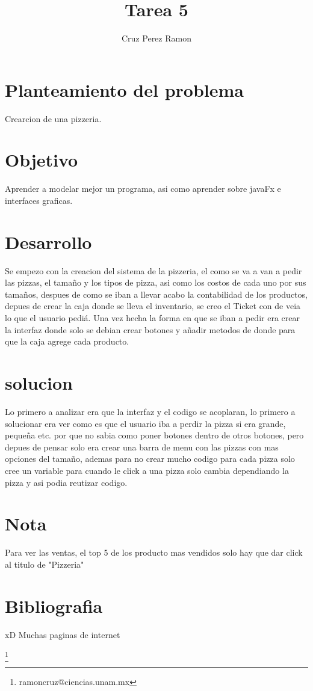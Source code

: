 \documentclass[12pt]{article}
\title{Tarea 5}
\author{Cruz Perez Ramon}
\begin{document}
\maketitle

\section{Planteamiento del problema}
Crearcion de una pizzeria.

\section{Objetivo}
Aprender a modelar mejor un programa, asi como aprender sobre javaFx e interfaces graficas.

\section{Desarrollo}
Se empezo con la creacion del sistema de la pizzeria, el como se va a van a pedir las pizzas, el tamaño y los tipos de pizza, asi como los costos de cada uno por sus tamaños, despues de como se iban a llevar acabo la contabilidad de los productos, depues de crear la caja donde se lleva el inventario, se creo el Ticket con de veia lo que el usuario pediá. Una vez hecha la forma en que se iban a pedir era crear la interfaz donde solo se debian crear botones y añadir metodos de donde para que la caja agrege cada producto.

\section{solucion}
Lo primero a analizar era que la interfaz y el codigo se acoplaran, lo primero a solucionar era ver como es que el usuario iba a perdir la pizza si era grande, pequeña etc. por que no sabia como poner botones dentro de otros botones, pero depues de pensar solo era crear una barra de menu con las pizzas con mas opciones del tamaño, ademas para no crear mucho codigo para cada pizza solo cree un variable para cuando le click a una pizza solo cambia dependiando la pizza y asi podia reutizar codigo.

\section{Nota}
Para ver las ventas, el top 5 de los producto mas vendidos solo hay que dar click al titulo de "Pizzeria" 
\section{Bibliografia}
xD Muchas paginas de internet

\footnote{ramoncruz@ciencias.unam.mx}
\end{document}
